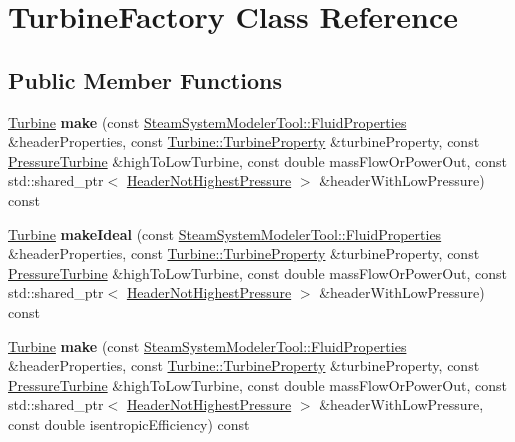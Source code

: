 \hypertarget{class_turbine_factory}{}\section{Turbine\+Factory Class Reference}
\label{class_turbine_factory}
\subsection*{Public Member Functions}
\begin{DoxyCompactItemize}
\item 
\mbox{\label{class_turbine_factory_acf5435509834ef1d0694b1323ad7f8df}} 
\hyperlink{class_turbine}{Turbine} {\bfseries make} (const \hyperlink{struct_steam_system_modeler_tool_1_1_fluid_properties}{Steam\+System\+Modeler\+Tool\+::\+Fluid\+Properties} \&header\+Properties, const \hyperlink{class_turbine_a5db4f65cf2539e3837684d53221ade12}{Turbine\+::\+Turbine\+Property} \&turbine\+Property, const \hyperlink{class_pressure_turbine}{Pressure\+Turbine} \&high\+To\+Low\+Turbine, const double mass\+Flow\+Or\+Power\+Out, const std\+::shared\+\_\+ptr$<$ \hyperlink{class_header_not_highest_pressure}{Header\+Not\+Highest\+Pressure} $>$ \&header\+With\+Low\+Pressure) const
\item 
\mbox{\label{class_turbine_factory_a4b5e84997feaeccd74b4a1a52842a874}} 
\hyperlink{class_turbine}{Turbine} {\bfseries make\+Ideal} (const \hyperlink{struct_steam_system_modeler_tool_1_1_fluid_properties}{Steam\+System\+Modeler\+Tool\+::\+Fluid\+Properties} \&header\+Properties, const \hyperlink{class_turbine_a5db4f65cf2539e3837684d53221ade12}{Turbine\+::\+Turbine\+Property} \&turbine\+Property, const \hyperlink{class_pressure_turbine}{Pressure\+Turbine} \&high\+To\+Low\+Turbine, const double mass\+Flow\+Or\+Power\+Out, const std\+::shared\+\_\+ptr$<$ \hyperlink{class_header_not_highest_pressure}{Header\+Not\+Highest\+Pressure} $>$ \&header\+With\+Low\+Pressure) const
\item 
\mbox{\label{class_turbine_factory_ab14f6bfd1b6202e9cf45d9d023f78f77}} 
\hyperlink{class_turbine}{Turbine} {\bfseries make} (const \hyperlink{struct_steam_system_modeler_tool_1_1_fluid_properties}{Steam\+System\+Modeler\+Tool\+::\+Fluid\+Properties} \&header\+Properties, const \hyperlink{class_turbine_a5db4f65cf2539e3837684d53221ade12}{Turbine\+::\+Turbine\+Property} \&turbine\+Property, const \hyperlink{class_pressure_turbine}{Pressure\+Turbine} \&high\+To\+Low\+Turbine, const double mass\+Flow\+Or\+Power\+Out, const std\+::shared\+\_\+ptr$<$ \hyperlink{class_header_not_highest_pressure}{Header\+Not\+Highest\+Pressure} $>$ \&header\+With\+Low\+Pressure, const double isentropic\+Efficiency) const

\end{DoxyCompactItemize}

